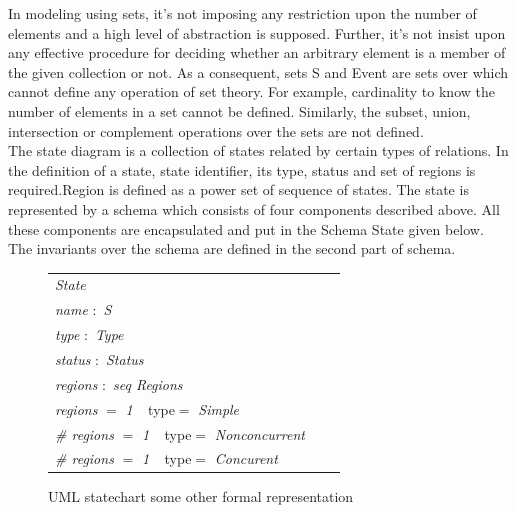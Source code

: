 In modeling using sets, it's not imposing any restriction upon the number of elements and a high level of
abstraction is supposed. Further, it's not insist upon any
effective procedure for deciding whether an arbitrary
element is a member of the given collection or not. As a
consequent, sets S and Event are sets over which cannot define any operation of set theory. For example,
cardinality to know the number of elements in a set cannot
be defined. Similarly, the subset, union, intersection or
complement operations over the sets are not defined.\\

The state diagram is a collection of states related by
certain types of relations. In the definition of a state, state identifier, its type, status and set of regions is required.Region is defined as a power set of sequence of states. The state is represented by a schema which consists of four components described above. All these components are encapsulated and put in the Schema State given below.
The invariants over the schema are defined in the second
part of schema.\\

\begin{figure}[ht!]
	\centering
	\begin{tabular}{lll}
		\footnotesize                       
		\textit{State}       \\
		
		\footnotesize
		\textit{name}   $:$    \textit{S}  \\   
		\footnotesize
		\textit{type}   $:$    \textit{Type}  \\   
		\footnotesize
		\textit{status}   $:$    \textit{Status}      \\
		\footnotesize
		\textit{regions} $:$   \textit{seq Regions} \\
		
		\footnotesize
		\textit{regions} $=$   \textit{1} $\ \  $ {type}$=$   \textit{Simple} \\
		\footnotesize
		 \textit{\# regions} $=$   \textit{1} $\ \  $ {type}$=$   \textit{Nonconcurrent} \\
		 \textit{\# regions} $=$   \textit{1} $\ \  $ {type}$=$   \textit{Concurent} \\
		 
		
	\end{tabular}
	\caption{UML statechart some other formal representation}
	\label{statechart_formal_representation_part2}
\end{figure}

